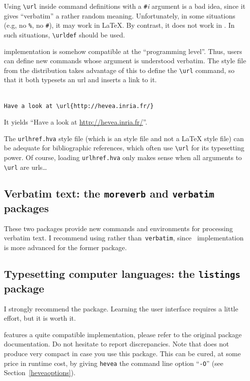 Using \verb+\url+ inside command definitions with a
\verb+#+\textit{i} argument is a bad idea, since
it gives ``verbatim'' a rather random meaning.
Unfortunately, in some situations (e.g, no \verb+%+, no \verb+#+),
it may work in \LaTeX{}. By
contrast, it does not work in \hevea{}. In such situations,
\verb+\urldef+ should be used.

\hevea{} implementation is somehow compatible at the ``programming level''.
Thus, users can define new commands whose argument is understood
verbatim. The  style file
from the distribution
takes advantage of this to define the \verb+\url+ command, so that it both
typesets an url and inserts a link to it.
\begin{htmlonly}
\begin{verbatim}

Have a look at \url{http://hevea.inria.fr/}
\end{verbatim}
It yields ``Have a look at \url{http://hevea.inria.fr/}''.
\end{htmlonly}
The \texttt{urlhref.hva}
style file (which is an \hevea{} style file and not a \LaTeX{}
style file) can be adequate for bibliographic references,
which often use \verb+\url+ for its typesetting power.
Of course, loading \texttt{urlhref.hva} only makes sense when
all arguments to \verb+\url+ are urls\ldots

\subsection{Verbatim text: the \texttt{moreverb} and
\texttt{verbatim} packages}
These two packages provide new commands and environments for
processing verbatim text.
I recommend using
rather than~\texttt{verbatim},
since \hevea{}~implementation is more advanced for the former package.



\subsection{Typesetting \label{listings:package}computer languages: the \texttt{listings} package}
%
I strongly recommend the
 package.
Learning the user interface requires a little effort, but it is worth
it.

\hevea{} features a quite compatible implementation, please refer to
the original package documentation.
Do not hesitate to report discrepancies.
Note that \hevea{} does not produce very compact
\html{} in case you use this package.
This can be cured, at some price in runtime cost, by
giving \texttt{hevea} the command line option ``\texttt{-O}''
(see Section~\ref{heveaoptions}).

